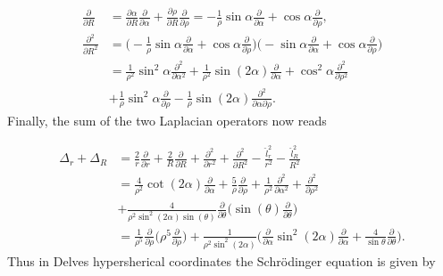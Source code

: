 \documentclass{article}
\begin{document}
\begin{subequations}
\begin{align}
        \frac{\partial}{\partial R}        &= \frac{\partial\alpha}{\partial R} \frac{\partial}{\partial\alpha} +  \frac{\partial\rho}{\partial R} \frac{\partial}{\partial\rho} = -\frac{1}{\rho}\sin{\alpha}\frac{\partial}{\partial \alpha} + \cos{\alpha}\frac{\partial}{\partial \rho},  \\
        \frac{\partial^2}{\partial R^2}&= \bigg( -\frac{1}{\rho} \sin\alpha \frac{\partial}{\partial\alpha} + \cos\alpha \frac{\partial}{\partial\rho}\bigg)  \bigg( -  \sin\alpha \frac{\partial}{\partial\alpha} + \cos\alpha \frac{\partial}{\partial\rho}\bigg) \nonumber \\
                                                    &= \frac{1}{\rho^2} \sin^2\alpha\frac{\partial^2}{\partial\alpha^{2}} + \frac{1}{\rho^2} \sin(2\alpha)\frac{\partial}{\partial\alpha} + \cos^2\alpha \frac{\partial^2}{\partial \rho^2} \nonumber \\
                                                    &+\frac{1}{\rho}\sin^2\alpha\frac{\partial}{\partial \rho}- \frac{1}{\rho} \sin(2\alpha) \frac{\partial^2}{\partial\alpha \partial\rho}.
\end{align}
\end{subequations}
Finally, the sum of the two Laplacian operators now reads 

\begin{align}
	\Delta_{r} + \Delta_{R} &= \frac{2}{r}\frac{\partial}{\partial r} +  \frac{2}{R} \frac{\partial}{\partial R}  +\frac{\partial^2}{\partial r^{2}} + \frac{\partial^2}{\partial R^{2}} - \frac{\hat{l}^{2}_{r}}{r^2} - \frac{\hat{l}^{2}_{R}}{R^2} \nonumber \\
									&= \frac{4}{\rho^2} \cot(2\alpha) \frac{\partial}{\partial\alpha} + \frac{5}{\rho} \frac{\partial}{\partial\rho} + \frac{1}{\rho^2} \frac{\partial^2}{\partial\alpha^2} + \frac{\partial^2}{\partial\rho^2} \nonumber \\
									&+ \frac{4}{\rho^2 \sin^2(2\alpha)\sin(\theta)} \frac{\partial}{\partial\theta} \bigg( \sin(\theta) \frac{\partial}{\partial{\theta}} \bigg) \nonumber \\
									&= \frac{1}{\rho^5}\frac{\partial}{\partial\rho} \bigg( \rho^5 \frac{\partial}{\partial\rho} \bigg) + \frac{1}{\rho^2 \sin^2(2\alpha)}  \bigg( \frac{\partial}{\partial\alpha} \sin^2(2\alpha) \frac{\partial}{\partial\alpha} + \frac{4}{\sin\theta} \frac{\partial}{\partial\theta} \bigg).
\end{align}
Thus in Delves hypersherical coordinates the Schr{\"o}dinger equation is given by 
\end{document}
